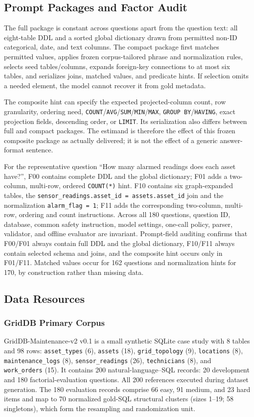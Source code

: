 \documentclass[applsci,article,submit,moreauthors]{Definitions/mdpi}
\begin{document}
\subsection{Prompt Packages and Factor Audit}
The full package is constant across questions apart from the question text: all eight-table DDL and a sorted global dictionary drawn from permitted non-ID categorical, date, and text columns. The compact package first matches permitted values, applies frozen corpus-tailored phrase and normalization rules, selects seed tables/columns, expands foreign-key connections to at most six tables, and serializes joins, matched values, and predicate hints. If selection omits a needed element, the model cannot recover it from gold metadata.

The composite hint can specify the expected projected-column count, row granularity, ordering need, \texttt{COUNT}/\texttt{AVG}/\texttt{SUM}/\texttt{MIN}/\texttt{MAX}, \texttt{GROUP BY}/\texttt{HAVING}, exact projection fields, descending order, or \texttt{LIMIT}. Its serialization also differs between full and compact packages. The estimand is therefore the effect of this frozen composite package as actually delivered; it is not the effect of a generic answer-format sentence.

For the representative question ``How many alarmed readings does each asset have?'', F00 contains complete DDL and the global dictionary; F01 adds a two-column, multi-row, ordered \texttt{COUNT(*)} hint. F10 contains six graph-expanded tables, the \texttt{sensor\_readings.asset\_id = assets.asset\_id} join and the normalization \texttt{alarm\_flag = 1}; F11 adds the corresponding two-column, multi-row, ordering and count instructions. Across all 180 questions, question ID, database, common safety instruction, model settings, one-call policy, parser, validator, and offline evaluator are invariant. Prompt-field auditing confirms that F00/F01 always contain full DDL and the global dictionary, F10/F11 always contain selected schema and joins, and the composite hint occurs only in F01/F11. Matched values occur for 162 questions and normalization hints for 170, by construction rather than missing data.

\subsection{Data Resources}
\subsubsection{GridDB Primary Corpus}
GridDB-Maintenance-v2 v0.1 is a small synthetic SQLite case study with 8 tables and 98 rows: \texttt{asset\_types} (6), \texttt{assets} (18), \texttt{grid\_topology} (9), \texttt{locations} (8), \texttt{maintenance\_logs} (8), \texttt{sensor\_readings} (26), \texttt{technicians} (8), and \texttt{work\_orders} (15). It contains 200 natural-language--SQL records: 20 development and 180 factorial-evaluation questions. All 200 references executed during dataset generation. The 180 evaluation records comprise 66 easy, 91 medium, and 23 hard items and map to 70 normalized gold-SQL structural clusters (sizes 1--19; 58 singletons), which form the resampling and randomization unit.
\end{document}
